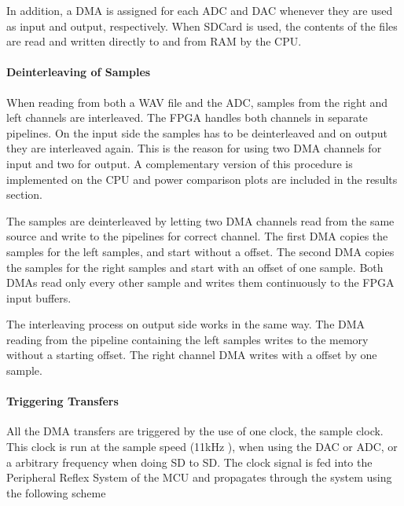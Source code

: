 In addition, a DMA is assigned for each ADC and DAC whenever
they are used as input and output, respectively. When SDCard is
used, the contents of the files are read and written directly to
and from RAM by the CPU.

\paragraph{Deinterleaving of Samples}

When reading from both a WAV file and the ADC, samples from
the right and left channels are interleaved. The FPGA handles
both channels in separate pipelines. On the input side the
samples has to be deinterleaved and on output they are
interleaved again. This is the reason for using two DMA channels
for input and two for output. A complementary version of this
procedure is implemented on the CPU and power comparison plots
are included in the results section. 


The samples are deinterleaved by letting two DMA channels read
from the same source and write to the pipelines for correct
channel. The first DMA copies the samples for the left samples,
and start without a offset. The second DMA copies the samples
for the right samples and start with an offset of one sample.
Both DMAs read only every other sample and writes them
continuously to the FPGA input buffers.

The interleaving process on output side works in the same way.
The DMA reading from the pipeline containing the left samples
writes to the memory without a starting offset. The right
channel DMA writes with a offset by one sample. 

\paragraph{Triggering Transfers}

All the DMA transfers are triggered by the use of one clock, the
sample clock. This clock is run at the sample speed (11kHz
), when using the DAC
or ADC, or a arbitrary frequency when doing SD to SD. The clock
signal is fed into the Peripheral Reflex System of the MCU and
propagates through the system using the following scheme

